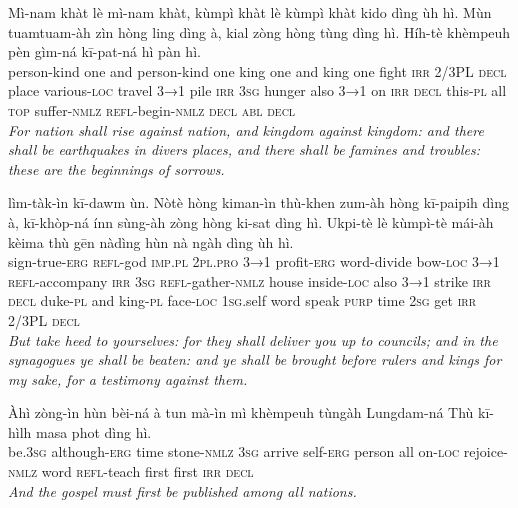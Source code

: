 \documentclass[11pt,a4paper]{article}
\begin{document}
\begin{exe}
\gll Mì-nam khàt lè mì-nam khàt, kùmpì khàt lè kùmpì khàt kido dìng ùh hì. Mùn tuamtuam-àh zìn hòng ling dìng à, kial zòng hòng tùng dìng hì. Híh-tè khèmpeuh pèn gìm-ná kī-pat-ná hì pàn hì. \\
     person-kind one and person-kind one king one and king one fight \textsc{irr} 2/3PL \textsc{decl} place various-\textsc{loc} travel \textsc{3→1} pile \textsc{irr} \textsc{3sg} hunger also \textsc{3→1} on \textsc{irr} \textsc{decl} this-\textsc{pl} all \textsc{top} suffer-\textsc{nmlz} \textsc{refl}-begin-\textsc{nmlz} \textsc{decl} \textsc{abl} \textsc{decl} \\
\glt \textcolor{kjvcolor}{\textit{For nation shall rise against nation, and kingdom against kingdom: and there shall be earthquakes in divers places, and there shall be famines and troubles: these are the beginnings of sorrows.}}

\gll lìm-tàk-ìn kī-dawm ùn. Nòtè hòng kiman-ìn thù-khen zum-àh hòng kī-paipih dìng à, kī-khòp-ná ínn sùng-àh zòng hòng ki-sat dìng hì. Ukpi-tè lè kùmpì-tè mái-àh kèima thù gēn nàdìng hùn nà ngàh dìng ùh hì. \\
     sign-true-\textsc{erg} \textsc{refl}-god \textsc{imp}.\textsc{pl} \textsc{2pl}.\textsc{pro} \textsc{3→1} profit-\textsc{erg} word-divide bow-\textsc{loc} \textsc{3→1} \textsc{refl}-accompany \textsc{irr} \textsc{3sg} \textsc{refl}-gather-\textsc{nmlz} house inside-\textsc{loc} also \textsc{3→1} strike \textsc{irr} \textsc{decl} duke-\textsc{pl} and king-\textsc{pl} face-\textsc{loc} \textsc{1sg}.self word speak \textsc{purp} time \textsc{2sg} get \textsc{irr} 2/3PL \textsc{decl} \\
\glt \textcolor{kjvcolor}{\textit{But take heed to yourselves: for they shall deliver you up to councils; and in the synagogues ye shall be beaten: and ye shall be brought before rulers and kings for my sake, for a testimony against them.}}

\gll Àhì zòng-ìn hùn bèi-ná à tun mà-ìn mì khèmpeuh tùngàh Lungdam-ná Thù kī-hìlh masa phot dìng hì. \\
     be.\textsc{3sg} although-\textsc{erg} time stone-\textsc{nmlz} \textsc{3sg} arrive self-\textsc{erg} person all on-\textsc{loc} rejoice-\textsc{nmlz} word \textsc{refl}-teach first first \textsc{irr} \textsc{decl} \\
\glt \textcolor{kjvcolor}{\textit{And the gospel must first be published among all nations.}}


\end{exe}
\end{document}
